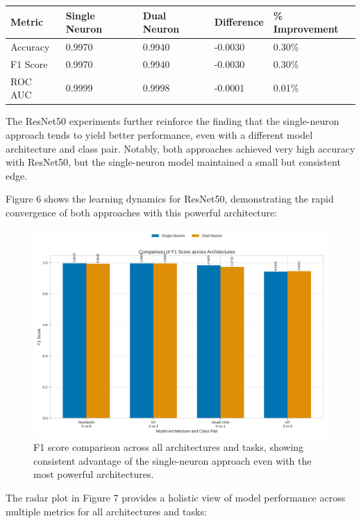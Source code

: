 \documentclass[11pt]{article}
\begin{document}
\begin{tabular}{lllll}
\hline
Metric & Single Neuron & Dual Neuron & Difference & \% Improvement \\
\hline
Accuracy & 0.9970 & 0.9940 & -0.0030 & 0.30\% \\
F1 Score & 0.9970 & 0.9940 & -0.0030 & 0.30\% \\
ROC AUC & 0.9999 & 0.9998 & -0.0001 & 0.01\% \\
\hline
\end{tabular}

The ResNet50 experiments further reinforce the finding that the single-neuron approach tends to yield better performance, even with a different model architecture and class pair. Notably, both approaches achieved very high accuracy with ResNet50, but the single-neuron model maintained a small but consistent edge.

Figure 6 shows the learning dynamics for ResNet50, demonstrating the rapid convergence of both approaches with this powerful architecture:

\begin{figure}[htbp]
\centering
\includegraphics[width=\textwidth]{figures/f1_score_comparison.png}
\caption{F1 score comparison across all architectures and tasks, showing consistent advantage of the single-neuron approach even with the most powerful architectures.}
\end{figure}

The radar plot in Figure 7 provides a holistic view of model performance across multiple metrics for all architectures and tasks:
\end{document}
